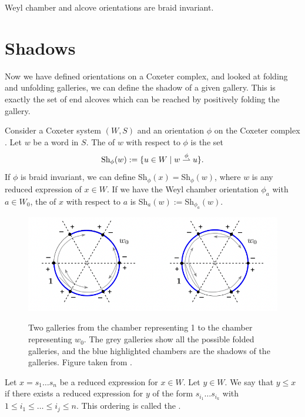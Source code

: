\documentclass[11pt]{article}
\begin{document}
\begin{proposition}
    Weyl chamber and alcove orientations are braid invariant.
\end{proposition}


\section{Shadows}\label{8}
Now we have defined orientations on a Coxeter complex, and looked at folding and unfolding galleries, we can define the shadow of a given gallery. This is exactly the set of end alcoves which can be reached by positively folding the gallery. 


\begin{definition}
    Consider a Coxeter system $(W,S)$ and an orientation $\phi$ on the Coxeter complex \sg. Let $w$ be a word in $S$. The  of $w$ with respect to $\phi$ is the set 
    \[\textnormal{Sh}_\phi(w):=\{u\in W\mid w\stackrel{\phi}{\rightharpoonup} u\}.\]
    If $\phi$ is braid invariant, we can define Sh$_\phi(x)=$Sh$_\phi(w)$, where $w$ is any reduced expression of $x\in W$. If we have the Weyl chamber orientation $\phi_a$ with $a\in W_0$, the  of $x$ with respect to $a$ is Sh$_a(w):=$Sh$_{\phi_a}(w)$. %
\end{definition}


\begin{figure}[!htbp]
    
    \begin{center}
    \includegraphics[scale=0.6]{Screenshot 2023-04-18 at 17.45.58.png}\\
    \end{center}
    \caption{Two galleries from the chamber representing 1 to the chamber representing $w_0$. The grey galleries show all the possible folded galleries, and the blue highlighted chambers are the shadows of the galleries. Figure taken from \cite[p.138]{SHA}. }
\end{figure}
\begin{definition}
    Let $x=s_1\hdots s_n$ be a reduced expression for $x\in W$. Let $y\in W$. We say that $y\leq x$ if there exists a reduced expression for $y$ of the form $s_{i_1}\hdots s_{i_k}$ with $1\leq i_1\leq\hdots \leq i_j\leq n$. This ordering is called the .
\end{definition}
\end{document}
